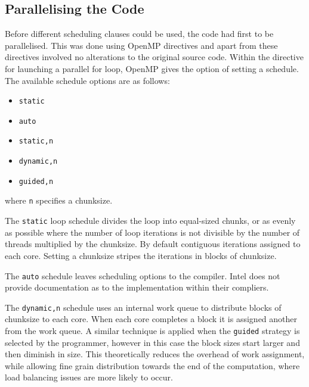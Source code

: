 \documentclass[a4paper,12pt]{article}
\begin{document}

\subsection{Parallelising the Code}

Before different scheduling clauses could be used, the code had first to be parallelised. This was done using OpenMP directives and apart from these directives involved no alterations to the original source code. Within the directive for launching a parallel for loop, OpenMP gives the option of setting a schedule. The available schedule options are as follows:
\begin{itemize}
\item \verb|static|
\item \verb|auto|
\item \verb|static,n|
\item \verb|dynamic,n|
\item \verb|guided,n|
\end{itemize}
where \verb|n| specifies a chunksize. 

The \verb|static| loop schedule divides the loop into equal-sized chunks, or as evenly as possible where the number of loop iterations is not divisible by the number of threads multiplied by the chunksize. By default contiguous iterations assigned to each core. Setting a chunksize stripes the iterations in blocks of chunksize.  

The \verb|auto| schedule leaves scheduling options to the compiler. Intel does not provide documentation as to the implementation within their compliers.

The \verb|dynamic,n| schedule uses an internal work queue to distribute blocks of chunksize to each core. When each core completes a block it is assigned another from the work queue. A similar technique is applied when the \verb|guided| strategy is selected by the programmer, however in this case the block sizes start larger and then diminish in size. This theoretically reduces the overhead of work assignment, while allowing fine grain distribution towards the end of the computation, where load balancing issues are more likely to occur.
\end{document}
